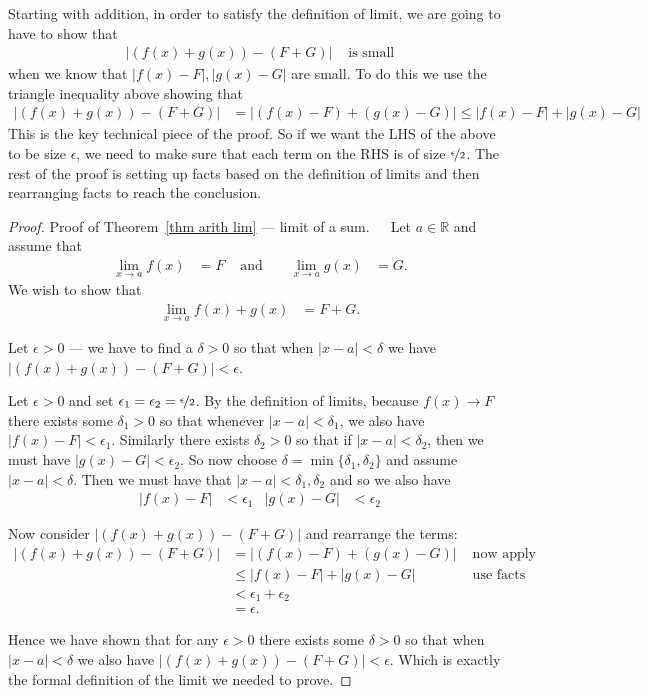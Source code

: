 Starting with addition, in order to satisfy the definition of limit, we are
going to have to show that
\begin{align*}
  |( f(x) + g(x) )-(F+G) | &\text{ is small}
\end{align*}
when we know that $|f(x)-F|, |g(x)-G|$ are small. To do this we use the
triangle inequality above showing that
\begin{align*}
  |( f(x) + g(x) )-(F+G) | &=
  |(f(x)-F) + (g(x)-G) | \leq |f(x)-F| + |g(x)-G|
\end{align*}
This is the key technical piece of the proof. So if we want the LHS of the
above to be size $\epsilon$, we need to make sure that each term on the RHS is
of size $\nicefrac{\epsilon}{2}$. The rest of the proof is setting up facts
based on the definition of limits and then rearranging facts to reach the
conclusion.
\begin{proof}{Proof of Theorem~\ref{thm arith lim} --- limit of a sum.}\ \ \
Let $a \in \mathbb{R}$ and assume that
\begin{align*}
  \lim_{x \to a} f(x) &= F & \text{ and } &&
  \lim_{x \to a} g(x) &= G.
\end{align*}
We wish to show that
\begin{align*}
\lim_{x \to a} f(x)+g(x) &= F+G.
\end{align*}

Let $\epsilon>0$ --- we have to find a $\delta>0$ so that when
$|x-a|<\delta$ we have $|(f(x)+g(x))-(F+G)|<\epsilon$.

Let $\epsilon>0$ and set $\epsilon_1 = \epsilon_2 = \nicefrac{\epsilon}{2}$.
By the definition of limits, because $f(x) \to F$ there exists some
$\delta_1 >0$ so that whenever $|x-a|<\delta_1$, we also
have $|f(x)-F|<\epsilon_1$. Similarly there exists $\delta_2>0$ so that if
$|x-a|<\delta_2$, then we must have $|g(x)-G|<\epsilon_2$. So now choose
$\delta = \min\{ \delta_1, \delta_2 \}$ and assume $|x-a|<\delta$. Then we must
have that $|x-a|<\delta_1, \delta_2$ and so we also have
\begin{align*}
  |f(x)-F|&<\epsilon_1 & |g(x)-G|& < \epsilon_2
\end{align*}

Now consider $|(f(x)+g(x))-(F+G)|$ and rearrange the terms:
\begin{align*}
  |(f(x)+g(x))-(F+G)| &= |(f(x)-F)+(g(x)-G)| & \text{ now apply triangle
inequality} \\
  &\leq |f(x)-F| + |g(x)-G| & \text{ use facts from above}\\
  & < \epsilon_1 + \epsilon_2 \\
  &= \epsilon.
\end{align*}

Hence we have shown that for any $\epsilon>0$ there exists some $\delta>0$ so
that when $|x-a|<\delta$ we also have $|(f(x)+g(x))-(F+G)|<\epsilon$. Which
is exactly the formal definition of the limit we needed to prove.
\end{proof}

